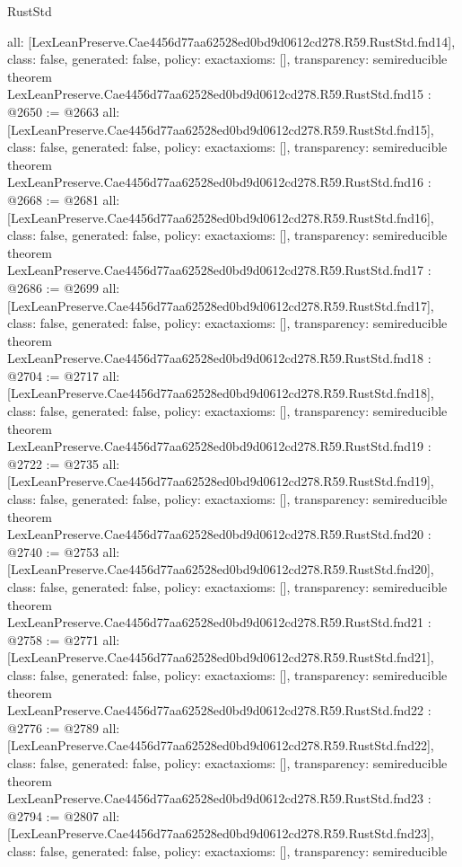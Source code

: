 \begin{lexlean}{RustStd}
\begin{coremodule}
{  all: [LexLeanPreserve.Cae4456d77aa62528ed0bd9d0612cd278.R59.RustStd.fnd14],
  class: false,
  generated: false,
  policy: exact{axioms: []},
  transparency: semireducible
}
theorem LexLeanPreserve.Cae4456d77aa62528ed0bd9d0612cd278.R59.RustStd.fnd15 : @2650 := @2663 {
  all: [LexLeanPreserve.Cae4456d77aa62528ed0bd9d0612cd278.R59.RustStd.fnd15],
  class: false,
  generated: false,
  policy: exact{axioms: []},
  transparency: semireducible
}
theorem LexLeanPreserve.Cae4456d77aa62528ed0bd9d0612cd278.R59.RustStd.fnd16 : @2668 := @2681 {
  all: [LexLeanPreserve.Cae4456d77aa62528ed0bd9d0612cd278.R59.RustStd.fnd16],
  class: false,
  generated: false,
  policy: exact{axioms: []},
  transparency: semireducible
}
theorem LexLeanPreserve.Cae4456d77aa62528ed0bd9d0612cd278.R59.RustStd.fnd17 : @2686 := @2699 {
  all: [LexLeanPreserve.Cae4456d77aa62528ed0bd9d0612cd278.R59.RustStd.fnd17],
  class: false,
  generated: false,
  policy: exact{axioms: []},
  transparency: semireducible
}
theorem LexLeanPreserve.Cae4456d77aa62528ed0bd9d0612cd278.R59.RustStd.fnd18 : @2704 := @2717 {
  all: [LexLeanPreserve.Cae4456d77aa62528ed0bd9d0612cd278.R59.RustStd.fnd18],
  class: false,
  generated: false,
  policy: exact{axioms: []},
  transparency: semireducible
}
theorem LexLeanPreserve.Cae4456d77aa62528ed0bd9d0612cd278.R59.RustStd.fnd19 : @2722 := @2735 {
  all: [LexLeanPreserve.Cae4456d77aa62528ed0bd9d0612cd278.R59.RustStd.fnd19],
  class: false,
  generated: false,
  policy: exact{axioms: []},
  transparency: semireducible
}
theorem LexLeanPreserve.Cae4456d77aa62528ed0bd9d0612cd278.R59.RustStd.fnd20 : @2740 := @2753 {
  all: [LexLeanPreserve.Cae4456d77aa62528ed0bd9d0612cd278.R59.RustStd.fnd20],
  class: false,
  generated: false,
  policy: exact{axioms: []},
  transparency: semireducible
}
theorem LexLeanPreserve.Cae4456d77aa62528ed0bd9d0612cd278.R59.RustStd.fnd21 : @2758 := @2771 {
  all: [LexLeanPreserve.Cae4456d77aa62528ed0bd9d0612cd278.R59.RustStd.fnd21],
  class: false,
  generated: false,
  policy: exact{axioms: []},
  transparency: semireducible
}
theorem LexLeanPreserve.Cae4456d77aa62528ed0bd9d0612cd278.R59.RustStd.fnd22 : @2776 := @2789 {
  all: [LexLeanPreserve.Cae4456d77aa62528ed0bd9d0612cd278.R59.RustStd.fnd22],
  class: false,
  generated: false,
  policy: exact{axioms: []},
  transparency: semireducible
}
theorem LexLeanPreserve.Cae4456d77aa62528ed0bd9d0612cd278.R59.RustStd.fnd23 : @2794 := @2807 {
  all: [LexLeanPreserve.Cae4456d77aa62528ed0bd9d0612cd278.R59.RustStd.fnd23],
  class: false,
  generated: false,
  policy: exact{axioms: []},
  transparency: semireducible
}
\end{coremodule}
\end{lexlean}

